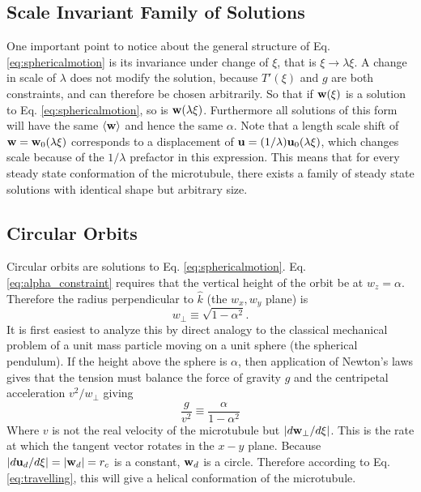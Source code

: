 \documentclass[pre,showpacs]{revtex4}
\def\bu{{\bf u}}
\def\bw{{\bf w}}
\begin{document}
\subsection{Scale Invariant Family of Solutions}
\label{subsec:ScaleInvariance}

One important point to notice about the general structure of Eq. \ref{eq:sphericalmotion} is its invariance under
change of $\xi$, that is $\xi \rightarrow \lambda \xi$. A change in scale of $\lambda$ does not modify the
solution, because $T'(\xi)$  and $g$ are both constraints, and can therefore be chosen arbitrarily. So that if
$\bw(\xi)$ is a solution to Eq. \ref{eq:sphericalmotion}, so is $\bw(\lambda \xi)$. Furthermore all solutions
of this form will have the same $\langle \bw \rangle$ and hence the same $\alpha$. Note that a length scale
shift of $\bw = \bw_0(\lambda \xi)$ corresponds to a displacement of $\bu = (1/\lambda)\bu_0(\lambda \xi)$, which
changes scale because of the $1/\lambda$ prefactor in this expression. This means that for every
steady state conformation of the microtubule, there exists a family of steady state solutions with identical
shape but arbitrary size.

\subsection{Circular Orbits}
\label{subsec:CircularOrbits}

Circular orbits are solutions to Eq. \ref{eq:sphericalmotion}. Eq. \ref{eq:alpha_constraint} requires that the vertical
height of the orbit be at $w_z = \alpha$. Therefore the radius perpendicular to $\hat k$ (the $w_x, w_y$ plane) is 
\begin{equation}
\label{eq:w_perp_alpha}
w_\perp \equiv \sqrt{1-\alpha^2}. 
\end{equation}
It is first easiest to analyze this by direct analogy to the classical mechanical problem of a unit mass particle moving on a unit sphere (the
spherical pendulum).
If the height above the sphere is $\alpha$, then application of Newton's laws gives that the tension must balance the force
of gravity $g$ and the centripetal acceleration $v^2/w_\perp$ giving
\begin{equation}
\frac{g}{v^2} \equiv \frac{\alpha}{1-\alpha^2} 
\end{equation}
Where $v$ is not the real velocity of the microtubule but $|d \bw_\perp/d\xi|$. This is the rate at which the
tangent vector rotates in the $x-y$ plane. 
Because $|d\bu_d/d\xi|  = |\bw_d| = r_c$ is a constant, $\bw_d$ is a circle. 
Therefore according to Eq. \ref{eq:travelling}, this will give a helical conformation of the microtubule. 
\end{document}
